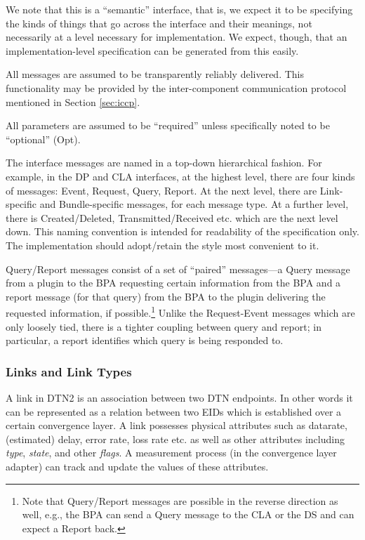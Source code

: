 \documentclass[11pt]{article}
\begin{document}
We note that this is a ``semantic'' interface, that is, we expect it to be
specifying the kinds of things that go across the interface and their meanings,
not necessarily at a level necessary for implementation. We expect, though,
that an implementation-level specification can be generated from this easily.

All messages are assumed to be transparently reliably delivered.  This
functionality may be provided by the inter-component communication protocol
mentioned in Section \ref{sec:iccp}.

All parameters are assumed to be ``required'' unless specifically
noted to be ``optional'' (Opt).

The interface messages are named in a top-down hierarchical
fashion. For example, in the DP and CLA interfaces, at the highest
level, there are four kinds of messages: Event, Request, Query,
Report. At the next level, there are Link-specific and Bundle-specific
messages, for each message type. At a further level, there is
Created/Deleted, Transmitted/Received etc. which are 
the next level down.  This naming convention is intended for readability 
of the specification only. The implementation should adopt/retain the style
most convenient to it.

Query/Report messages consist of a set of ``paired'' messages---a Query
message from a plugin to the BPA requesting certain information from the BPA
and a report message (for that query) from the BPA to the plugin delivering the
requested information, if possible.\footnote{Note that Query/Report messages are
possible in the reverse direction as well, e.g., the BPA can send a Query
message to the CLA or the DS and can expect a Report back.} Unlike the
Request-Event messages which are only loosely tied, there is a tighter coupling
between query and report; in particular, a report identifies which query is
being responded to.

\subsubsection{Links and Link Types} \label{sec:linktypes}

A link in DTN2 is an association between two DTN endpoints. In other words it
can be represented as a relation between two EIDs which is established over a
certain convergence layer. A link possesses physical attributes such as
datarate, (estimated) delay, error rate, loss rate etc. as well as other
attributes including {\it type}, {\it state}, and other {\it flags}.  A 
measurement process (in the convergence layer adapter) can track and 
update the values of these attributes.
\end{document}
